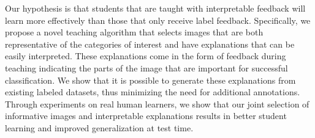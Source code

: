 \documentclass[../main.tex]{subfiles}
\begin{document}
Our hypothesis is that students that are taught with interpretable feedback will learn more effectively than those that only receive label feedback. 
Specifically, we propose a novel teaching algorithm that selects images that are both representative of the categories of interest and have explanations that can be easily interpreted. 
These explanations come in the form of feedback during teaching indicating the parts of the image that are important for successful classification. 
We show that it is possible to generate these explanations from existing labeled datasets, thus minimizing the need for additional annotations.
Through experiments on real human learners, we show that our joint selection of informative images and interpretable explanations results in better student learning and improved generalization at test time. 
\end{document}
